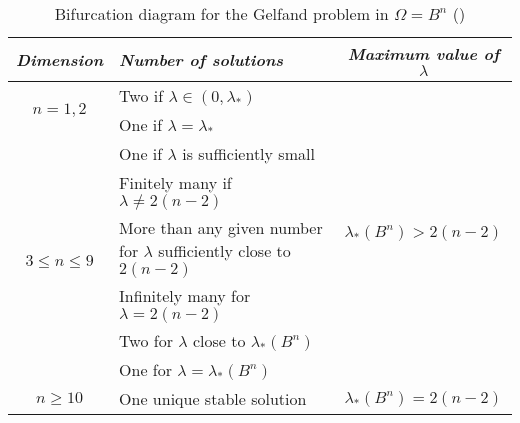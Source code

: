 \begin{table}[ht!]
    \center
    \renewcommand{\arraystretch}{1.2}
    \begin{tabular}{|c|p{}|c|}
\hline
\textit{Dimension}                 & \textit{Number of solutions}                                            & \textit{Maximum value of $\lambda$}                  \\ \hline
\multirow{2}{*}{$n=1,2$}           & Two if $\lambda\in(0,\lambda_\ast)$                                     & \multirow{8}{*}{$\lambda_\ast(B^n)>2(n-2)$} \\ \cline{2-2}
                                   & One if $\lambda=\lambda_\ast$                                           &                                             \\ \cline{1-2}
\multirow{6}{*}{$3\leq n  \leq 9$} & One if $\lambda$ is sufficiently small                                  &                                             \\ \cline{2-2}
                                   & Finitely many if $\lambda\neq 2(n-2)$                                   &                                             \\ \cline{2-2}
                                   & More than any given number for $\lambda$ sufficiently close to $2(n-2)$ &                                             \\ \cline{2-2}
                                   & Infinitely many for $\lambda = 2(n-2)$                                  &                                             \\ \cline{2-2}
                                   & Two for $\lambda$ close to $\lambda_\ast(B^n)$                          &                                             \\ \cline{2-2}
                                   & One for $\lambda = \lambda_\ast(B^n)$                                   &                                             \\ \hline
$n\geq 10$                         & One unique stable solution                                              & $\lambda_\ast(B^n)=2(n-2)$                  \\ \hline
\end{tabular}
\caption{Bifurcation diagram for the Gelfand problem in $\Omega = B^n$ (\cite{stable-solutions-elliptic})}
\label{table:bifurcation-ball}
\end{table}
